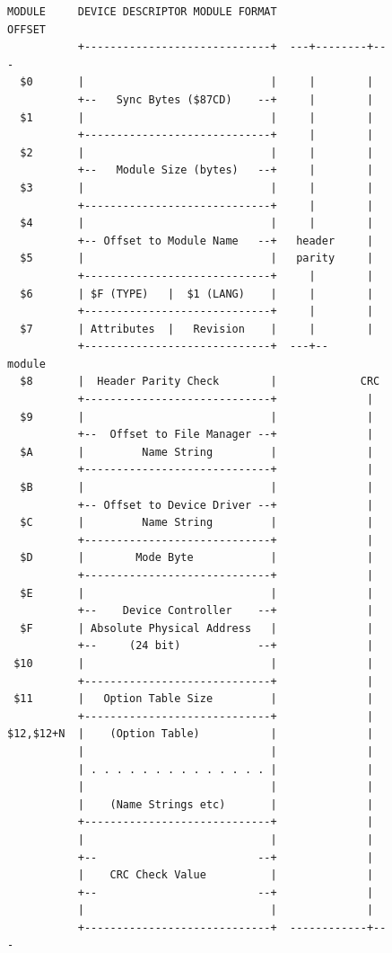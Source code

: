 \documentclass[
]{article}
\begin{document}
\begin{figure}
\centering
\begin{verbatim}
MODULE     DEVICE DESCRIPTOR MODULE FORMAT
OFFSET
           +-----------------------------+  ---+--------+---
  $0       |                             |     |        |
           +--   Sync Bytes ($87CD)    --+     |        |
  $1       |                             |     |        |
           +-----------------------------+     |        |
  $2       |                             |     |        |
           +--   Module Size (bytes)   --+     |        |
  $3       |                             |     |        |
           +-----------------------------+     |        |
  $4       |                             |     |        |
           +-- Offset to Module Name   --+   header     |
  $5       |                             |   parity     |
           +-----------------------------+     |        |
  $6       | $F (TYPE)   |  $1 (LANG)    |     |        |
           +-----------------------------+     |        |
  $7       | Attributes  |   Revision    |     |        |
           +-----------------------------+  ---+--    module
  $8       |  Header Parity Check        |             CRC
           +-----------------------------+              |
  $9       |                             |              |
           +--  Offset to File Manager --+              |
  $A       |         Name String         |              |
           +-----------------------------+              |
  $B       |                             |              |
           +-- Offset to Device Driver --+              |
  $C       |         Name String         |              |
           +-----------------------------+              |
  $D       |        Mode Byte            |              |
           +-----------------------------+              |
  $E       |                             |              |
           +--    Device Controller    --+              |
  $F       | Absolute Physical Address   |              |
           +--     (24 bit)            --+              |
 $10       |                             |              |
           +-----------------------------+              |
 $11       |   Option Table Size         |              |
           +-----------------------------+              |
$12,$12+N  |    (Option Table)           |              |
           |                             |              |
           | . . . . . . . . . . . . . . |              |
           |                             |              |
           |    (Name Strings etc)       |              |
           +-----------------------------+              |
           |                             |              |
           +--                         --+              |
           |    CRC Check Value          |              |
           +--                         --+              |
           |                             |              |
           +-----------------------------+  ------------+---
\end{verbatim}
\caption{}
\end{figure}
\end{document}
